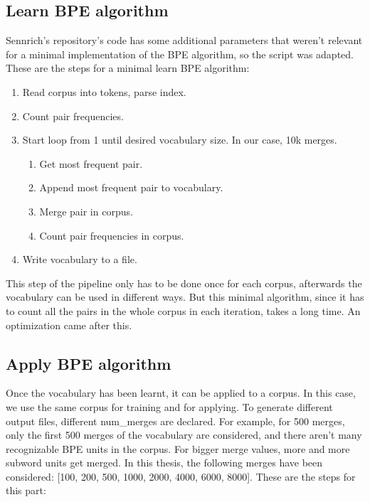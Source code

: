 \subsection{Learn BPE algorithm}

Sennrich's repository's code has some additional parameters that weren't relevant for a minimal implementation of the BPE algorithm, so the script was adapted. These are the steps for a minimal learn BPE algorithm:

\begin{enumerate}
	\item Read corpus into tokens, parse index.
	\item Count pair frequencies.
	\item Start loop from 1 until desired vocabulary size. In our case, 10k merges.
	\begin{enumerate}
		\item Get most frequent pair.
		\item Append most frequent pair to vocabulary.
		\item Merge pair in corpus.
		\item Count pair frequencies in corpus.
	\end{enumerate}
	\item Write vocabulary to a file.
\end{enumerate}

This step of the pipeline only has to be done once for each corpus, afterwards the vocabulary can be used in different ways. But this minimal algorithm, since it has to count all the pairs in the whole corpus in each iteration, takes a long time. An optimization came after this.

\subsection{Apply BPE algorithm}

Once the vocabulary has been learnt, it can be applied to a corpus. In this case, we use the same corpus for training and for applying. To generate different output files, different num\_merges are declared. For example, for 500 merges, only the first 500 merges of the vocabulary are considered, and there aren't many recognizable BPE units in the corpus. For bigger merge values, more and more subword units get merged. In this thesis, the following merges have been considered: [100, 200, 500, 1000, 2000, 4000, 6000, 8000]. These are the steps for this part:

